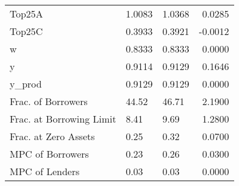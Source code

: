 \begin{table}
\begin{tabular}{lllr}
                  Top25A &  1.0083 &   1.0368 &  0.0285 \\
                  Top25C &  0.3933 &   0.3921 & -0.0012 \\
                       w &  0.8333 &   0.8333 &  0.0000 \\
                       y &  0.9114 &   0.9129 &  0.1646 \\
                  y\_prod &  0.9129 &   0.9129 &  0.0000 \\
      Frac. of Borrowers &   44.52 &    46.71 &  2.1900 \\
Frac. at Borrowing Limit &    8.41 &     9.69 &  1.2800 \\
    Frac. at Zero Assets &    0.25 &     0.32 &  0.0700 \\
        MPC of Borrowers &    0.23 &     0.26 &  0.0300 \\
          MPC of Lenders &    0.03 &     0.03 &  0.0000 \\
\bottomrule
\end{tabular}
\end{table}
